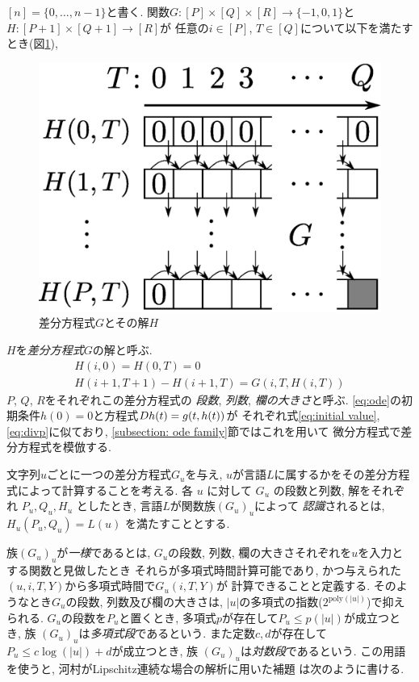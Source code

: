 $[n] = \{0, \dots , n-1\}$と書く.
関数$G \colon [P] \times [Q] \times [R] \to \{-1, 0, 1\}$と
$H \colon [P + 1] \times [Q+1] \to [R]$が
任意の$i \in [P]$, $T \in [Q]$について以下を満たすとき(図\ref{fig:divp}), 
\begin{figure}
 \begin{center}
  \includegraphics[height=0.15\textheight]{image/divp.eps}
 \end{center}
 \caption{差分方程式$G$とその解$H$}
 \label{fig:divp}
\end{figure}
$H$を\emph{差分方程式}\kern\xkanjiskip$G$の解と呼ぶ.
\begin{gather}
   H(i, 0) = H(0, T) = 0 \label{eq:initial value}
\\
   H(i + 1, T + 1) - H(i+1, T) = G(i, T, H(i, T))  \label{eq:divp}
\end{gather}
$P$, $Q$, $R$をそれぞれこの差分方程式の
\emph{段数}, \emph{列数}, \emph{欄の大きさ}と呼ぶ.
\eqref{eq:ode}の初期条件$h(0) = 0$と方程式$D h(t) = g(t, h(t))$が
それぞれ式\eqref{eq:initial value}, \eqref{eq:divp}に似ており, 
\ref{subsection: ode family}節ではこれを用いて
微分方程式で差分方程式を模倣する. 

文字列$u$ごとに一つの差分方程式$G _u$を与え,
$u$が言語$L$に属するかをその差分方程式によって計算することを考える.
各 $u$ に対して $G_u$ の段数と列数, 解をそれぞれ $P_u, Q_u, H_u$ としたとき,
言語$L$が関数族$(G_u)_u$によって
\emph{認識}されるとは,
$H_u(P_u, Q_u) = L(u)$ を満たすこととする.

族$(G_u)_u$が\emph{一様}であるとは,
$G_u$の段数, 列数, 欄の大きさそれぞれを$u$を入力とする関数と見做したとき
それらが多項式時間計算可能であり,
かつ与えられた$(u, i, T, Y)$から多項式時間で$G_u(i, T, Y)$が
計算できることと定義する.
そのようなとき$G _u$の段数, 列数及び欄の大きさは,
$|u|$の多項式の指数($2^{\mathrm{poly} (|u|)}$)で抑えられる.
$G_u$の段数を$P_u$と置くとき, 多項式$p$が存在して$P_u \le p(|u|)$が成立つとき,
族 $(G_u) _u$は\emph{多項式段}であるという.
また定数$c,d$が存在して$P_u \le c \log(|u|)+d$が成立つとき,
族 $(G_u) _u$は\emph{対数段}であるという. 
この用語を使うと, 
河村がLipschitz連続な場合の解析に用いた補題
\cite[補題4.7]{kawamura2010lipschitz}は次のように書ける. 

